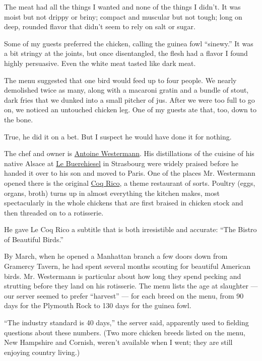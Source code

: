 The meat had all the things I wanted and none of the things I didn't. It
was moist but not drippy or briny; compact and muscular but not tough;
long on deep, rounded flavor that didn't seem to rely on salt or sugar.

Some of my guests preferred the chicken, calling the guinea fowl
``sinewy.'' It was a bit stringy at the joints, but once disentangled,
the flesh had a flavor I found highly persuasive. Even the white meat
tasted like dark meat.

The menu suggested that one bird would feed up to four people. We nearly
demolished twice as many, along with a macaroni gratin and a bundle of
stout, dark fries that we dunked into a small pitcher of jus. After we
were too full to go on, we noticed an untouched chicken leg. One of my
guests ate that, too, down to the bone.

True, he did it on a bet. But I suspect he would have done it for
nothing.

The chef and owner is \href{https://twitter.com/ChefWestermann}{Antoine
Westermann}. His distillations of the cuisine of his native Alsace at
\href{http://www.buerehiesel.fr/EN_index.asp}{Le Buerehiesel} in
Strasbourg were widely praised before he handed it over to his son and
moved to Paris. One of the places Mr. Westermann opened there is the
original \href{http://en.lecoqrico.com/}{Coq Rico}, a theme restaurant
of sorts. Poultry (eggs, organs, broth) turns up in almost everything
the kitchen makes, most spectacularly in the whole chickens that are
first braised in chicken stock and then threaded on to a rotisserie.

He gave Le Coq Rico a subtitle that is both irresistible and accurate:
``The Bistro of Beautiful Birds.''

By March, when he opened a Manhattan branch a few doors down from
Gramercy Tavern, he had spent several months scouting for beautiful
American birds. Mr. Westermann is particular about how long they spend
pecking and strutting before they land on his rotisserie. The menu lists
the age at slaughter --- our server seemed to prefer ``harvest'' --- for
each breed on the menu, from 90 days for the Plymouth Rock to 130 days
for the guinea fowl.

``The industry standard is 40 days,'' the server said, apparently used
to fielding questions about these numbers. (Two more chicken breeds
listed on the menu, New Hampshire and Cornish, weren't available when I
went; they are still enjoying country living.)


